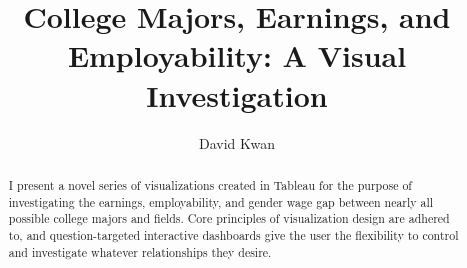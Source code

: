 \documentclass[sigchi]{acmart}
\begin{document}
\title{College Majors, Earnings, and Employability: A Visual Investigation}

\author{David Kwan}


\begin{abstract}
 I present a novel series of visualizations created in Tableau for the purpose of investigating the earnings, employability, and gender wage gap between nearly all possible college majors and fields. Core principles of visualization design are adhered to, and question-targeted interactive dashboards give the user the flexibility to control and investigate whatever relationships they desire. 
\end{abstract}

\end{document}
